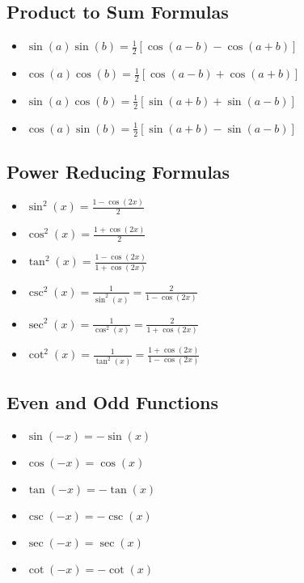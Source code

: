 \subsection{Product to Sum Formulas}
\begin{itemize}[label=$-$]
    \item \( \sin(a)\sin(b) = \frac{1}{2}[\cos(a - b) - \cos(a + b)] \)
    \item \( \cos(a)\cos(b) = \frac{1}{2}[\cos(a - b) + \cos(a + b)] \)
    \item \( \sin(a)\cos(b) = \frac{1}{2}[\sin(a + b) + \sin(a - b)] \)
    \item \( \cos(a)\sin(b) = \frac{1}{2}[\sin(a + b) - \sin(a - b)] \)
\end{itemize}

\subsection{Power Reducing Formulas}
\begin{itemize}[label=$-$]
    \item \( \sin^2(x) = \frac{1 - \cos(2x)}{2} \)
    \item \( \cos^2(x) = \frac{1 + \cos(2x)}{2} \)
    \item \( \tan^2(x) = \frac{1 - \cos(2x)}{1 + \cos(2x)}\)
    \item \( \csc^2(x) = \frac{1}{\sin^2(x)} = \frac{2}{1 - \cos(2x)} \)
    \item \( \sec^2(x) = \frac{1}{\cos^2(x)} = \frac{2}{1 + \cos(2x)} \)
    \item \( \cot^2(x) = \frac{1}{\tan^2(x)} = \frac{1 + \cos(2x)}{1 - \cos(2x)}\)
\end{itemize}

\subsection{Even and Odd Functions}
\begin{itemize}[label=$-$]
    \item \( \sin(-x) = -\sin(x) \)
    \item \( \cos(-x) = \cos(x) \)
    \item \( \tan(-x) = -\tan(x) \)
    \item \( \csc(-x) = -\csc(x) \)
    \item \( \sec(-x) = \sec(x) \)
    \item \( \cot(-x) = -\cot(x) \)
\end{itemize}

